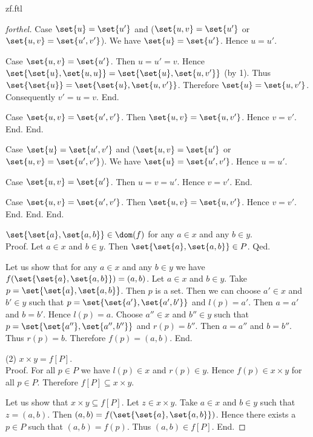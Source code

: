\documentclass{naproche-library}
\begin{document}
\begin{smodule}{zf.ftl}
\begin{proof}[forthel]
      Case $\set{u} = \set{u'}$ and ($\set{u,v} = \set{u'}$ or $\set{u,v} = \set{u',v'}$).
        We have $\set{u} = \set{u'}$.
        Hence $u = u'$.

        Case $\set{u,v} = \set{u'}$.
          Then $u = u'= v$.
          Hence $\set{\set{u}, \set{u,u}} = \set{\set{u}, \set{u,v'}}$ (by 1).
          Thus $\set{\set{u}} = \set{\set{u}, \set{u,v'}}$.
          Therefore $\set{u} = \set{u,v'}$.
          Consequently $v' = u = v$.
        End.

        Case $\set{u,v} = \set{u',v'}$.
          Then $\set{u,v} = \set{u,v'}$.
          Hence $v = v'$.
        End.
      End.

      Case $\set{u} = \set{u',v'}$ and ($\set{u,v} = \set{u'}$ or $\set{u,v} = \set{u',v'}$).
        We have $\set{u} = \set{u',v'}$.
        Hence $u = u'$.

        Case $\set{u,v} = \set{u'}$.
          Then $u = v = u'$.
          Hence $v = v'$.
        End.

        Case $\set{u,v} = \set{u',v'}$.
          Then $\set{u,v} = \set{u,v'}$.
          Hence $v = v'$.
        End.
      End.
    End.

    $\set{\set{a}, \set{a,b}} \in \dom(f)$ for any $a \in x$ and any $b \in y$. \\ %
    Proof.
      Let $a \in x$ and $b \in y$.
      Then $\set{\set{a}, \set{a,b}} \in P$.
    Qed.

    Let us show that for any $a \in x$ and any $b \in y$ we have $f(\set{\set{a}, \set{a,b}}) = (a,b)$.
      Let $a \in x$ and $b \in y$.
      Take $p = \set{\set{a}, \set{a,b}}$.
      Then $p$ is a set.
      Then we can choose $a' \in x$ and $b' \in y$ such that $p = \set{\set{a'}, \set{a',b'}}$ and $l(p) = a'$.
      Then $a = a'$ and $b = b'$.
      Hence $l(p) = a$.
      Choose $a'' \in x$ and $b'' \in y$ such that $p = \set{\set{a''}, \set{a'',b''}}$ and $r(p) = b''$.
      Then $a = a''$ and $b = b''$.
      Thus $r(p) = b$.
      Therefore $f(p) = (a,b)$.
    End.

    (2) $x \times y = f[P]$. \\
    Proof.
      For all $p \in P$ we have $l(p) \in x$ and $r(p) \in y$.
      Hence $f(p) \in x \times y$ for all $p \in P$.
      Therefore $f[P] \subseteq x \times y$.

      Let us show that $x \times y \subseteq f[P]$.
        Let $z \in x \times y$.
        Take $a \in x$ and $b \in y$ such that $z = (a,b)$.
        Then $(a,b) = f(\set{\set{a}, \set{a,b}})$.
        Hence there exists a $p \in P$ such that $(a,b) = f(p)$.
        Thus $(a,b) \in f[P]$.
      End.


\end{proof}
\end{smodule}
\end{document}
